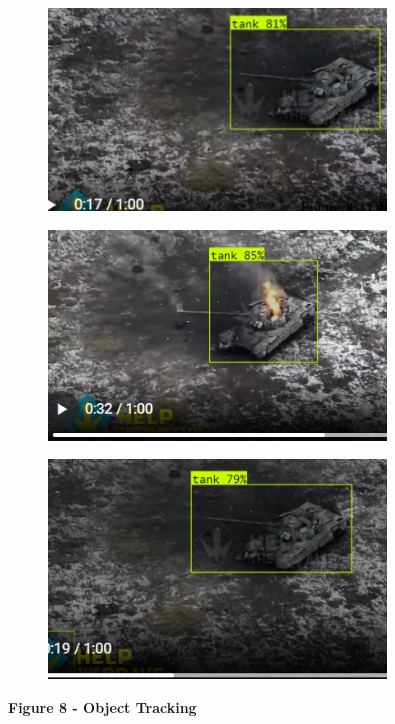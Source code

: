 \begin{figure}[H]
	\centering
	\includegraphics[width=0.8\textwidth]{assets/23}
	\caption*{}
\end{figure}\begin{figure}[H]
	\centering
	\includegraphics[width=0.8\textwidth]{assets/24}
	\caption*{}
\end{figure}\begin{figure}[H]
	\centering
	\includegraphics[width=0.8\textwidth]{assets/25}
	\caption*{}
\end{figure}

\textbf{Figure 8 - Object Tracking}

